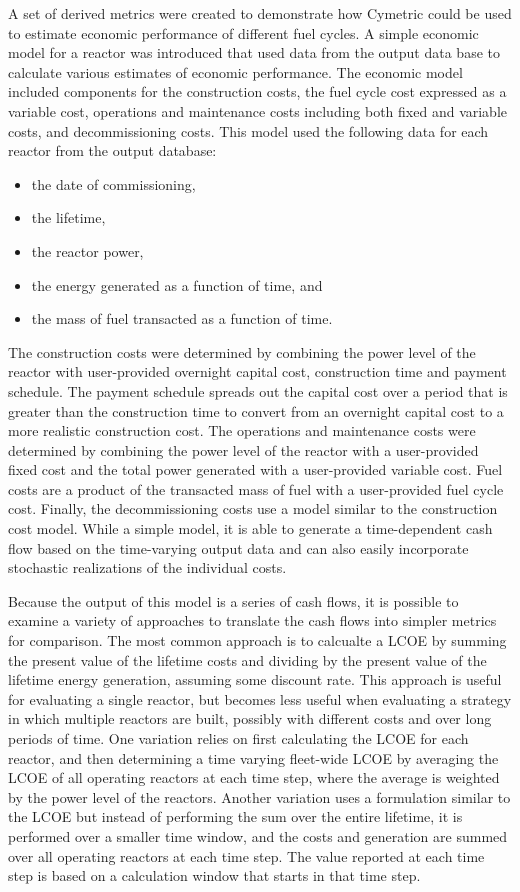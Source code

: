 A set of derived metrics were created to demonstrate how Cymetric could be
used to estimate economic performance of different fuel cycles.  A simple
economic model for a reactor was introduced that used data from the \Cyclus
output data base to calculate various estimates of economic performance.  The
economic model included components for the construction costs, the fuel cycle
cost expressed as a variable cost, operations and maintenance costs including
both fixed and variable costs, and decommissioning costs.  This model used the
following data for each reactor from the \Cyclus output database:
\begin{itemize}
\item the date of commissioning,
\item the lifetime,
\item the reactor power,
\item the energy generated as a function of time, and
\item the mass of fuel transacted as a function of time.
\end{itemize}

The construction costs were determined by combining the power level of the
reactor with user-provided overnight capital cost, construction time and
payment schedule.  The payment schedule spreads out the capital cost over a
period that is greater than the construction time to convert from an overnight
capital cost to a more realistic construction cost.  The operations and
maintenance costs were determined by combining the power level of the reactor
with a user-provided fixed cost and the total power generated with a
user-provided variable cost.  Fuel costs are a product of the transacted mass
of fuel with a user-provided fuel cycle cost.  Finally, the decommissioning
costs use a model similar to the construction cost model.  While a simple
model, it is able to generate a time-dependent cash flow based on the
time-varying \Cyclus output data and can also easily incorporate stochastic
realizations of the individual costs.

Because the output of this model is a series of cash flows, it is possible to
examine a variety of approaches to translate the cash flows into simpler
metrics for comparison.  The most common approach is to calcualte a \gls{LCOE}
by summing the present value of the lifetime costs and dividing by the present
value of the lifetime energy generation, assuming some discount rate.  This
approach is useful for evaluating a single reactor, but becomes less useful
when evaluating a strategy in which multiple reactors are built, possibly with
different costs and over long periods of time.  One variation relies on first
calculating the \gls{LCOE} for each reactor, and then determining a time
varying fleet-wide \gls{LCOE} by averaging the \gls{LCOE} of all operating
reactors at each time step, where the average is weighted by the power level
of the reactors.  Another variation uses a formulation similar to the
\gls{LCOE} but instead of performing the sum over the entire lifetime, it is
performed over a smaller time window, and the costs and generation are summed
over all operating reactors at each time step.  The value reported at each
time step is based on a calculation window that starts in that time step.

